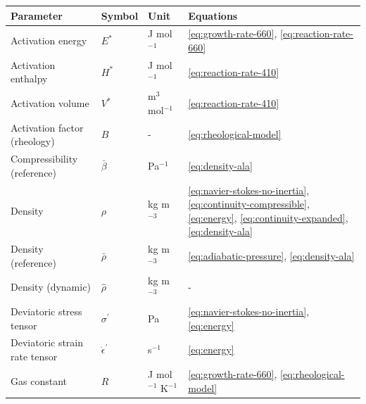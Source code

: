 \documentclass[draft,linenumbers]{agujournal2019}
\newcounter{none}
\begin{document}
{\def\LTcaptype{none} %
\begin{longtable}[]{@{}
  >{\raggedright\arraybackslash}p{}
  >{\raggedright\arraybackslash}p{}
  >{\raggedright\arraybackslash}p{}
  >{\raggedright\arraybackslash}p{}@{}}
\toprule\noalign{}
\begin{minipage}[b]{\linewidth}\raggedright
Parameter
\end{minipage} & \begin{minipage}[b]{\linewidth}\raggedright
Symbol
\end{minipage} & \begin{minipage}[b]{\linewidth}\raggedright
Unit
\end{minipage} & \begin{minipage}[b]{\linewidth}\raggedright
Equations
\end{minipage} \\
\midrule\noalign{}
\endhead
\bottomrule\noalign{}
\endlastfoot
Activation energy & \(E^{\ast}\) & J mol\(^{-1}\) &
\ref{eq:growth-rate-660}, \ref{eq:reaction-rate-660} \\
Activation enthalpy & \(H^{\ast}\) & J mol\(^{-1}\) &
\ref{eq:reaction-rate-410} \\
Activation volume & \(V^{\ast}\) & m\(^3\) mol\(^{-1}\) &
\ref{eq:reaction-rate-410} \\
Activation factor (rheology) & \(B\) & - & \ref{eq:rheological-model} \\
Compressibility (reference) & \(\bar{\beta}\) & Pa\(^{-1}\) &
\ref{eq:density-ala} \\
Density & \(\rho\) & kg m\(^{-3}\) &
\ref{eq:navier-stokes-no-inertia}, \ref{eq:continuity-compressible}, \ref{eq:energy}, \ref{eq:continuity-expanded}, \ref{eq:density-ala} \\
Density (reference) & \(\bar{\rho}\) & kg m\(^{-3}\) &
\ref{eq:adiabatic-pressure}, \ref{eq:density-ala} \\
Density (dynamic) & \(\hat{\rho}\) & kg m\(^{-3}\) & - \\
Deviatoric stress tensor & \(\sigma^{\prime}\) & Pa &
\ref{eq:navier-stokes-no-inertia}, \ref{eq:energy} \\
Deviatoric strain rate tensor & \(\dot{\epsilon}^{\prime}\) & s\(^{-1}\)
& \ref{eq:energy} \\
Gas constant & \(R\) & J mol\(^{-1}\) K\(^{-1}\) &
\ref{eq:growth-rate-660}, \ref{eq:rheological-model} \\

\end{longtable}}
\end{document}
